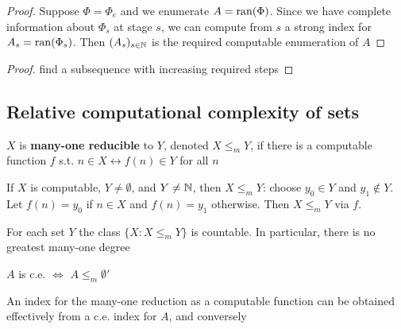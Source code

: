 \documentclass[11pt]{article}
\begin{document}
\begin{proof}
Suppose \(\Phi=\Phi_e\) and we enumerate \(A=\operatorname{ran}(\Phi)\). Since we have complete information
about \(\Phi_s\) at stage \(s\), we can compute from \(s\) a strong index for \(A_s=\operatorname{ran}(\Phi_s)\).
Then \((A_s)_{s\in\mathbb{N}}\) is the required computable enumeration of \(A\)
\end{proof}

\begin{exercise}
\label{1.1.17}
\end{exercise}

\begin{exercise}
\label{1.1.19}
\end{exercise}

\begin{proof}
find a subsequence with increasing required steps
\end{proof}
\subsection{Relative computational complexity of sets}
\label{sec:orgc2c59b5}


\begin{definition}[]
\(X\) is \textbf{many-one reducible} to \(Y\), denoted \(X\le_mY\), if there is a computable function \(f\)
s.t. \(n\in X\leftrightarrow f(n)\in Y\) for all \(n\)
\end{definition}

If \(X\) is computable, \(Y\neq\emptyset\), and \(Y\neq\mathbb{N}\), then \(X\le_mY\): choose \(y_0\in Y\) and \(y_1\notin Y\).
Let \(f(n)=y_0\) if \(n\in X\) and \(f(n)=y_1\) otherwise. Then \(X\le_mY\) via \(f\).

For each set \(Y\) the class \(\{X:X\le_mY\}\) is countable. In particular, there is no greatest
many-one degree

\begin{proposition}[]
\label{1.2.2}
\(A\) is c.e. \(\Leftrightarrow\) \(A\le_m\emptyset'\)

An index for the many-one reduction as a computable function can be obtained effectively from a
c.e. index for \(A\), and conversely
\end{proposition}
\end{document}
